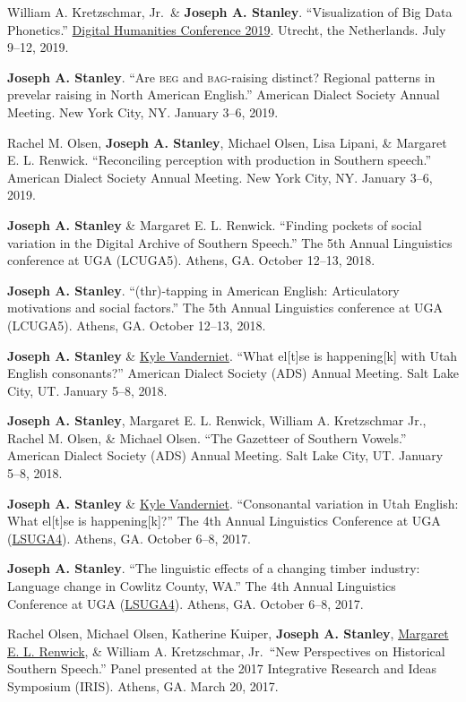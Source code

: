 \documentclass[
]{article}
\begin{document}
William A. Kretzschmar, Jr.~\& \textbf{Joseph A. Stanley}.
``Visualization of Big Data Phonetics.''
\href{https://dh2019.adho.org}{Digital Humanities Conference 2019}.
Utrecht, the Netherlands. July 9--12, 2019.

\textbf{Joseph A. Stanley}. ``Are \textsc{beg} and \textsc{bag}-raising
distinct? Regional patterns in prevelar raising in North American
English.'' American Dialect Society Annual Meeting. New York City, NY.
January 3--6, 2019.

Rachel M. Olsen, \textbf{Joseph A. Stanley}, Michael Olsen, Lisa Lipani,
\& Margaret E. L. Renwick. ``Reconciling perception with production in
Southern speech.'' American Dialect Society Annual Meeting. New York
City, NY. January 3--6, 2019.

\textbf{Joseph A. Stanley} \& Margaret E. L. Renwick. ``Finding pockets
of social variation in the Digital Archive of Southern Speech.'' The 5th
Annual Linguistics conference at UGA (LCUGA5). Athens, GA. October
12--13, 2018.

\textbf{Joseph A. Stanley}. ``(thr)-tapping in American English:
Articulatory motivations and social factors.'' The 5th Annual
Linguistics conference at UGA (LCUGA5). Athens, GA. October 12--13,
2018.

\textbf{Joseph A. Stanley} \&
\href{https://clyguy.wixsite.com/profile}{Kyle Vanderniet}. ``What
el{[}t{]}se is happening{[}k{]} with Utah English consonants?'' American
Dialect Society (ADS) Annual Meeting. Salt Lake City, UT. January 5--8,
2018.

\textbf{Joseph A. Stanley}, Margaret E. L. Renwick, William A.
Kretzschmar Jr., Rachel M. Olsen, \& Michael Olsen. ``The Gazetteer of
Southern Vowels.'' American Dialect Society (ADS) Annual Meeting. Salt
Lake City, UT. January 5--8, 2018.

\textbf{Joseph A. Stanley} \&
\href{https://clyguy.wixsite.com/profile}{Kyle Vanderniet}.
``Consonantal variation in Utah English: What el{[}t{]}se is
happening{[}k{]}?'' The 4th Annual Linguistics Conference at UGA
(\href{http://www.linguistics.uga.edu/lcuga-4}{LSUGA4}). Athens, GA.
October 6--8, 2017.

\textbf{Joseph A. Stanley}. ``The linguistic effects of a changing
timber industry: Language change in Cowlitz County, WA.'' The 4th Annual
Linguistics Conference at UGA
(\href{http://www.linguistics.uga.edu/lcuga-4}{LSUGA4}). Athens, GA.
October 6--8, 2017.

Rachel Olsen, Michael Olsen, Katherine Kuiper, \textbf{Joseph A.
Stanley}, \href{http://faculty.franklin.uga.edu/mrenwick/}{Margaret E.
L. Renwick}, \& William A. Kretzschmar, Jr.~``New Perspectives on
Historical Southern Speech.'' Panel presented at the 2017 Integrative
Research and Ideas Symposium (IRIS). Athens, GA. March 20, 2017.
\end{document}
